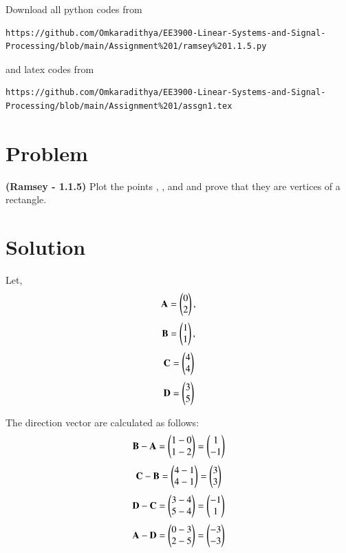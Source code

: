 \documentclass[journal,12pt,twocolumn]{IEEEtran}
\begin{document}
\maketitle
\newpage
\bigskip
\renewcommand{\thefigure}{\theenumi}
\renewcommand{\thetable}{\theenumi}
Download all python codes from 
\begin{lstlisting}
https://github.com/Omkaradithya/EE3900-Linear-Systems-and-Signal-Processing/blob/main/Assignment%201/ramsey%201.1.5.py
\end{lstlisting}
%
and latex codes from 
%
\begin{lstlisting}
https://github.com/Omkaradithya/EE3900-Linear-Systems-and-Signal-Processing/blob/main/Assignment%201/assgn1.tex
\end{lstlisting}
\section*{\textbf{Problem}}
\textbf{(Ramsey - 1.1.5)} Plot the points , ,  and  and prove that they are vertices of a rectangle.
\section*{\textbf{Solution}}
Let,
\begin{align}
    \mathbf{A} = \begin{pmatrix}0 \\ 2\end{pmatrix},
\end{align}
\begin{align}
    \mathbf{B} = \begin{pmatrix}1 \\ 1\end{pmatrix}, 
\end{align}
\begin{align}    
    \mathbf{C} = \begin{pmatrix}4 \\ 4\end{pmatrix}
\end{align}
\begin{align}
    \mathbf{D} = \begin{pmatrix}3 \\ 5\end{pmatrix}
\end{align}

The direction vector are calculated as follows:
\begin{align}
\mathbf{B-A} = \begin{pmatrix}1-0 \\ 1-2\end{pmatrix}
= \begin{pmatrix}1 \\ -1\end{pmatrix}
\end{align}
\begin{align}
\mathbf{C-B} = \begin{pmatrix}4-1 \\ 4-1\end{pmatrix}
= \begin{pmatrix}3 \\ 3\end{pmatrix}
\end{align}
\begin{align}
\mathbf{D-C} = \begin{pmatrix}3-4 \\ 5-4\end{pmatrix}
= \begin{pmatrix}-1 \\ 1\end{pmatrix}
\end{align}
\begin{align}
\mathbf{A-D} = \begin{pmatrix}0-3 \\ 2-5\end{pmatrix}
= \begin{pmatrix}-3 \\ -3\end{pmatrix}
\end{align}
\end{document}
